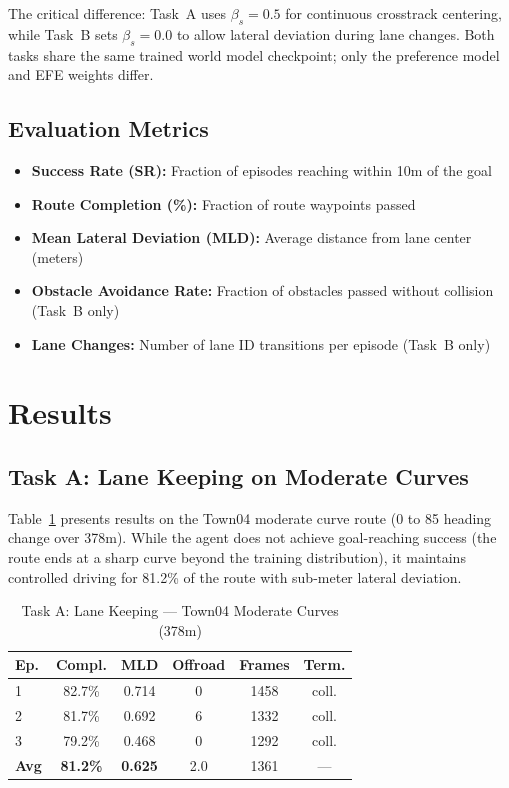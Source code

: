 \documentclass[conference]{IEEEtran}
\begin{document}
The critical difference: Task~A uses $\beta_s{=}0.5$ for continuous crosstrack centering, while Task~B sets $\beta_s{=}0.0$ to allow lateral deviation during lane changes. Both tasks share the same trained world model checkpoint; only the preference model and EFE weights differ.

\subsection{Evaluation Metrics}

\begin{itemize}
    \item \textbf{Success Rate (SR):} Fraction of episodes reaching within 10m of the goal
    \item \textbf{Route Completion (\%):} Fraction of route waypoints passed
    \item \textbf{Mean Lateral Deviation (MLD):} Average distance from lane center (meters)
    \item \textbf{Obstacle Avoidance Rate:} Fraction of obstacles passed without collision (Task~B only)
    \item \textbf{Lane Changes:} Number of lane ID transitions per episode (Task~B only)
\end{itemize}

\section{Results}
\label{sec:results}

\subsection{Task A: Lane Keeping on Moderate Curves}

Table~\ref{tab:task_a} presents results on the Town04 moderate curve route (0\degree{} to 85\degree{} heading change over 378m). While the agent does not achieve goal-reaching success (the route ends at a sharp curve beyond the training distribution), it maintains controlled driving for 81.2\% of the route with sub-meter lateral deviation.

\begin{table}[t]
\centering
\caption{Task A: Lane Keeping --- Town04 Moderate Curves (378m)}
\label{tab:task_a}
\begin{tabular}{lccccc}
\toprule
\textbf{Ep.} & \textbf{Compl.} & \textbf{MLD} & \textbf{Offroad} & \textbf{Frames} & \textbf{Term.} \\
\midrule
1 & 82.7\% & 0.714 & 0 & 1458 & coll. \\
2 & 81.7\% & 0.692 & 6 & 1332 & coll. \\
3 & 79.2\% & 0.468 & 0 & 1292 & coll. \\
\midrule
\textbf{Avg} & \textbf{81.2\%} & \textbf{0.625} & 2.0 & 1361 & --- \\
\bottomrule
\end{tabular}
\end{table}
\end{document}
